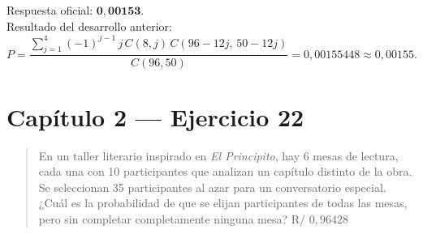 \documentclass[11pt]{article}
\begin{document}
\begin{resp}
Respuesta oficial: $\mathbf{0{,}00153}$.\\
Resultado del desarrollo anterior:
\[
P=\frac{\sum_{j=1}^{4}(-1)^{j-1}\,j\,C(8,j)\,C(96-12j,\,50-12j)}{C(96,50)}=0{,}00155448\approx 0{,}00155 .
\]
\end{resp}

\section*{Cap\'itulo 2 --- Ejercicio 22}

\begin{quote}
En un taller literario inspirado en \emph{El Principito}, hay 6 mesas de lectura, cada una con 10 participantes que analizan un cap\'itulo distinto de la obra. Se seleccionan 35 participantes al azar para un conversatorio especial. ¿Cu\'al es la probabilidad de que se elijan participantes de todas las mesas, pero sin completar completamente ninguna mesa? \hfill R/ $0{,}96428$
\end{quote}
\end{document}
